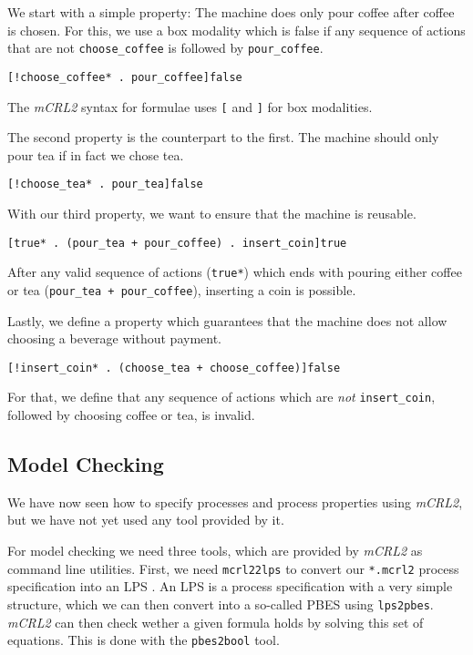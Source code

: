 \documentclass{clseminar}
\begin{document}
  We start with a simple property: The machine does only pour coffee after coffee is chosen. For this, we use a box modality which is false if any sequence of actions that are not \texttt{choose\_coffee} is followed by \texttt{pour\_coffee}.

  \begin{lstlisting}[language=mCRL2]
[!choose_coffee* . pour_coffee]false
  \end{lstlisting}

  The \textit{mCRL2} syntax for formulae uses \texttt{[} and \texttt{]} for box modalities.

  The second property is the counterpart to the first. The machine should only pour tea if in fact we chose tea.

  \begin{lstlisting}[language=mCRL2]
[!choose_tea* . pour_tea]false
  \end{lstlisting}

  With our third property, we want to ensure that the machine is reusable.

  \begin{lstlisting}[language=mCRL2]
[true* . (pour_tea + pour_coffee) . insert_coin]true
  \end{lstlisting}

  After any valid sequence of actions (\texttt{true*}) which ends with pouring either coffee or tea (\texttt{pour\_tea + pour\_coffee}), inserting a coin is possible.

  Lastly, we define a property which guarantees that the machine does not allow choosing a beverage without payment.

  \begin{lstlisting}[language=mCRL2]
[!insert_coin* . (choose_tea + choose_coffee)]false
  \end{lstlisting}

  For that, we define that any sequence of actions which are \textit{not} \texttt{insert\_coin}, followed by choosing coffee or tea, is invalid.

  \subsection{Model Checking}

  We have now seen how to specify processes and process properties using \textit{mCRL2}, but we have not yet used any tool provided by it.

  For model checking we need three tools, which are provided by \textit{mCRL2} as command line utilities. First, we need \texttt{mcrl22lps} to convert our \texttt{*.mcrl2} process specification into an LPS \cite[Linear Process Specifications]{mcrl2doc}. An LPS is a process specification with a very simple structure, which we can then convert into a so-called PBES \cite[Parametrized Boolean Equation Systems]{mcrl2doc} using \texttt{lps2pbes}. \textit{mCRL2} can then check wether a given formula holds by solving this set of equations. This is done with the \texttt{pbes2bool} tool.
\end{document}
